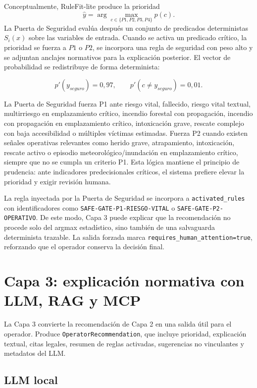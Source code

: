 Conceptualmente, RuleFit-lite produce la prioridad
\[
\hat{y}=\arg\max_{c \in \{P1,P2,P3,P4\}} p(c).
\]
La Puerta de Seguridad evalúa después un conjunto de predicados deterministas \(S_i(x)\) sobre las variables de entrada. Cuando se activa un predicado crítico, la prioridad se fuerza a \(P1\) o \(P2\), se incorpora una regla de seguridad con peso alto y se adjuntan anclajes normativos para la explicación posterior. El vector de probabilidad se redistribuye de forma determinista:

\[
p'(y_{seguro}) = 0{,}97,\qquad p'(c \neq y_{seguro}) = 0{,}01.
\]

La Puerta de Seguridad fuerza P1 ante riesgo vital, fallecido, riesgo vital textual, multirriesgo en emplazamiento crítico, incendio forestal con propagación, incendio con propagación en emplazamiento crítico, intoxicación grave, rescate complejo con baja accesibilidad o múltiples víctimas estimadas. Fuerza P2 cuando existen señales operativas relevantes como herido grave, atrapamiento, intoxicación, rescate activo o episodio meteorológico/inundación en emplazamiento crítico, siempre que no se cumpla un criterio P1. Esta lógica mantiene el principio de prudencia: ante indicadores predecisionales críticos, el sistema prefiere elevar la prioridad y exigir revisión humana.

La regla inyectada por la Puerta de Seguridad se incorpora a \texttt{activated\_rules} con identificadores como \texttt{SAFE-GATE-P1-RIESGO-VITAL} o \texttt{SAFE-GATE-P2-OPERATIVO}. De este modo, Capa 3 puede explicar que la recomendación no procede solo del argmax estadístico, sino también de una salvaguarda determinista trazable. La salida forzada marca \texttt{requires\_human\_attention=true}, reforzando que el operador conserva la decisión final.

\section{Capa 3: explicación normativa con LLM, RAG y MCP}

La Capa 3 convierte la recomendación de Capa 2 en una salida útil para el operador. Produce \texttt{OperatorRecommendation}, que incluye prioridad, explicación textual, citas legales, resumen de reglas activadas, sugerencias no vinculantes y metadatos del LLM.

\subsection{LLM local}

